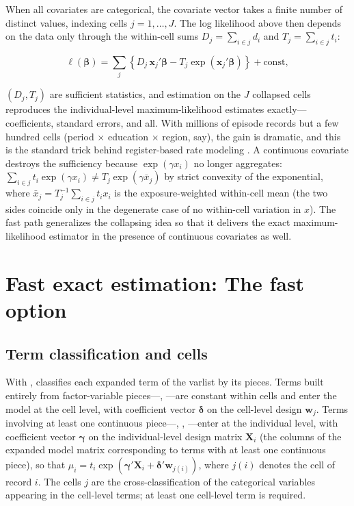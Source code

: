 \documentclass[12pt,a4paper]{article}
\begin{document}
\label{sec:suff}

When all covariates are categorical, the covariate vector takes a finite
number of distinct values, indexing cells \(j = 1, \ldots, J\). The log
likelihood above then depends on the data only through the within-cell
sums \(D_j = \sum_{i \in j} d_i\) and \(T_j = \sum_{i \in j} t_i\):

\begin{equation*}
\ell(\bm{\beta}) = \sum_j \left\{ D_j\, \mathbf{x}_j'\bm{\beta}
  - T_j \exp(\mathbf{x}_j'\bm{\beta}) \right\} + \text{const},
\end{equation*}

\((D_j, T_j)\) are sufficient statistics, and estimation on the \(J\)
collapsed cells reproduces the individual-level maximum-likelihood
estimates exactly---coefficients, standard errors, and all. With
millions of episode records but a few hundred cells (period \(\times\)
education \(\times\) region, say), the gain is dramatic, and this is the
standard trick behind register-based rate modeling
\citep{clayton1993, dickman2004}. A continuous covariate destroys the
sufficiency because \(\exp(\gamma x_i)\) no longer aggregates:
\(\sum_{i \in j} t_i \exp(\gamma x_i) \neq T_j \exp(\gamma \bar{x}_j)\)
by strict convexity of the exponential, where
\(\bar{x}_j = T_j^{-1}\sum_{i \in j} t_i x_i\) is the exposure-weighted
within-cell mean (the two sides coincide only in the degenerate case of
no within-cell variation in \(x\)). The fast path generalizes the
collapsing idea so that it delivers the exact maximum-likelihood
estimator in the presence of continuous covariates as well.

\section{Fast exact estimation: The fast option}

\label{sec:fast}

\subsection{Term classification and
cells}\label{term-classification-and-cells}

With ,  classifies each expanded term of the
varlist by its pieces. Terms built entirely from factor-variable
pieces---, ---are constant within
cells and enter the model at the cell level, with coefficient vector
\(\bm{\delta}\) on the cell-level design \(\mathbf{w}_j\). Terms
involving at least one continuous piece---,
, ---enter at the individual
level, with coefficient vector \(\bm{\gamma}\) on the individual-level
design matrix \(\mathbf{X}_i\) (the columns of the expanded model matrix
corresponding to terms with at least one continuous piece), so that
\(\mu_i = t_i \exp(\bm{\gamma}'\mathbf{X}_i + \bm{\delta}'\mathbf{w}_{j(i)})\),
where \(j(i)\) denotes the cell of record \(i\). The cells \(j\) are the
cross-classification of the categorical variables appearing in the
cell-level terms; at least one cell-level term is required.
\end{document}
